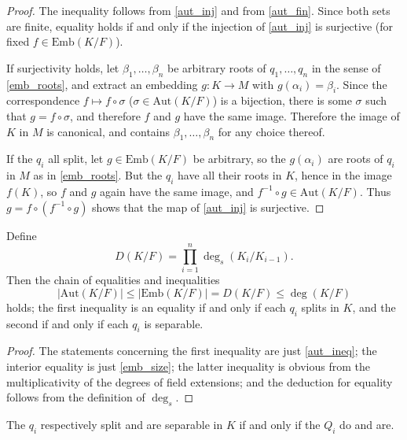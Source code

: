 \begin{proof} The inequality follows from \ref{aut_inj} and from
\ref{aut_fin}.
Since both sets are finite, equality holds if and only if the injection of
\ref{aut_inj} is surjective (for fixed $f \in \text{Emb}(K/F)$).

If surjectivity holds, let $\beta_1, \dots, \beta_n$ be arbitrary roots of
$q_1, \dots, q_n$ in the sense of \ref{emb_roots}, and extract an embedding $g
\colon K \to M$ with $g(\alpha_i) = \beta_i$. Since the correspondence $f
\mapsto f \circ \sigma$ ($\sigma \in \text{Aut}(K/F)$) is a bijection, there is some
$\sigma$ such that $g = f \circ \sigma$, and therefore $f$ and $g$ have the
same image. Therefore the image of $K$ in $M$ is canonical, and contains
$\beta_1, \dots, \beta_n$ for any choice thereof.

If the $q_i$ all split, let $g \in \text{Emb}(K/F)$ be arbitrary, so the
$g(\alpha_i)$ are roots of $q_i$ in $M$ as in \ref{emb_roots}. But the $q_i$
have all their roots in $K$, hence in the image $f(K)$, so $f$ and $g$ again
have the same image, and $f^{-1} \circ g \in \text{Aut}(K/F)$. Thus $g = f \circ
(f^{-1} \circ g)$ shows that the map of \ref{aut_inj} is surjective.
\end{proof}

\begin{lemma} Define
\begin{equation*}
D(K/F) = \prod_{i = 1}^n \deg_s(K_i/K_{i - 1}).
\end{equation*}
Then the chain of equalities and inequalities
\begin{equation*}
|\text{Aut}(K/F)| \leq |\text{Emb}(K/F)| = D(K/F) \leq \deg(K/F)
\end{equation*}
holds; the first inequality is an equality if and only if each $q_i$ splits in
$K$, and the second if and only if each $q_i$ is separable.
\label{large_aut_ineq}
\end{lemma}

\begin{proof} The statements concerning the first inequality are just
\ref{aut_ineq}; the interior equality is just \ref{emb_size}; the latter
inequality is obvious from the multiplicativity of the degrees of field
extensions; and the deduction for equality follows from the definition of
$\deg_s$. \end{proof}

\begin{lemma} The $q_i$ respectively split and are separable in $K$ if and
only
if the $Q_i$ do and are.
\label{absolute_sepsplit}
\end{lemma}

